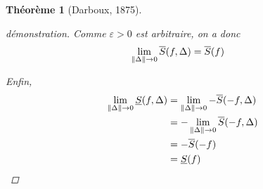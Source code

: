 \documentclass{report}
\newcommand*{\Ssup}[1]{\overline{S}(#1)}
\newcommand*{\Sinf}[1]{\underline{S}(#1)}
\newcommand*{\norme}[1]{\left\| #1 \right\|}
\newcommand*{\eps}{\varepsilon}
\newtheorem*{thm}{Th\'eor\`eme}
\theoremstyle{definition}
\theoremstyle{remark}
\begin{document}
\begin{thm}[Darboux, 1875]
\begin{proof}[d\'emonstration]
			Comme $\eps>0$ est arbitraire, on a donc
			\begin{align*}
				\lim\limits_{\norme{\Delta} \to 0}\ssup{f}&= \Ssup{f}
			\end{align*}

			Enfin,
			\begin{align*}
				\lim\limits_{\norme{\Delta} \to 0} \sinf{f}&= \lim\limits_{\norme{\Delta} \to 0} -\ssup{-f}\\
				&= -\lim\limits_{\norme{\Delta} \to 0} \ssup{-f}\\
				&= -\Ssup{-f}\\
				&= \Sinf{f}
			\end{align*}
		\end{proof}
	\end{thm}
\end{document}
